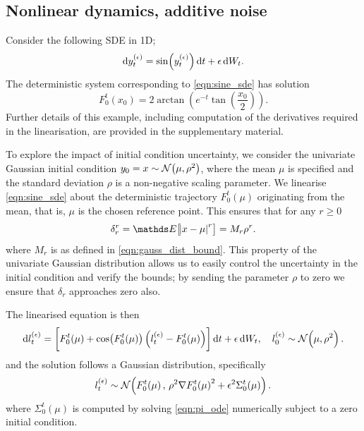\subsection{Nonlinear dynamics, additive noise}\label{sec:numerics_nonlinear}
Consider the following SDE in 1D;
\begin{equation}\label{eqn:sine_sde}
	\dif y_t^{(\epsilon)} = \sin\!\left(y_t^{(\epsilon)}\right)\dif t + \epsilon \dif W_t.
\end{equation}
The deterministic system corresponding to \cref{eqn:sine_sde} has solution
\[
	F_0^t\!\left(x_0\right) = 2\arctan\left(e^{-t}\tan\left(\frac{x_0}{2}\right)\right).
\]
Further details of this example, including computation of the derivatives required in the linearisation, are provided in the supplementary material.

To explore the impact of initial condition uncertainty, we consider the univariate Gaussian initial condition \(y_0 = x \sim \mathcal{N}\!\left(\mu, \rho^2\right)\), where the mean \(\mu\) is specified and the standard deviation \(\rho\) is a non-negative scaling parameter.
We linearise \cref{eqn:sine_sde} about the deterministic trajectory \(F_0^t\!\left(\mu\right)\) originating from the mean, that is, \(\mu\) is the chosen reference point.
This ensures that for any \(r \geq 0\)
\begin{equation}\label{eqn:num_gauss_init}
	\delta_r^r = \avg{\abs{x - \mu}^r} = M_r \rho^r.
\end{equation}
where \(M_r\) is as defined in \cref{eqn:gauss_dist_bound}.
This property of the univariate Gaussian distribution allows us to easily control the uncertainty in the initial condition and verify the bounds; by sending the parameter \(\rho\) to zero we ensure that \(\delta_r\) approaches zero also.

The linearised equation is then
\begin{equation}
	\dif l_t^{(\epsilon)} = \left[F_0^t\!\left(\mu\right) + \cos\!\left(F_0^t\!\left(\mu\right)\right)\left(l_t^{(\epsilon)} - F_0^t\!\left(\mu\right)\right)\right]\dif t + \epsilon \dif W_t, \quad l_0^{(\epsilon)} \isGauss{\mu, \rho^2}.
	\label{eqn:sine_linear}
\end{equation}
and the solution follows a Gaussian distribution, specifically
\begin{equation}\label{eqn:num_linear_sol}
	l_t^{(\epsilon)} \sim\mathcal{N}\!\left(F_0^t\!\left(\mu\right), \, \rho^2\nabla F_0^t\!\left(\mu\right)^2 + \epsilon^2\Sigma_0^t\!\left(\mu\right)\right).
\end{equation}
where \(\Sigma_0^t\!\left(\mu\right)\) is computed by solving \cref{eqn:pi_ode} numerically subject to a zero initial condition.


